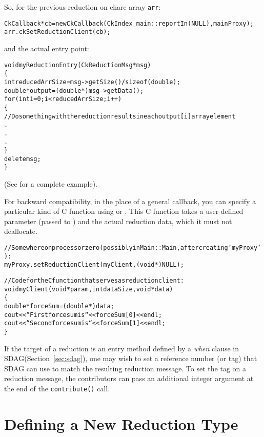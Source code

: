 So, for the previous reduction on chare array {\tt arr}:
\begin{alltt}
    CkCallback *cb = new CkCallback(CkIndex_main::reportIn(NULL),  mainProxy);
    arr.ckSetReductionClient(cb);
\end{alltt}

and the actual entry point:

\begin{alltt}
void myReductionEntry(CkReductionMsg *msg)
\{
  int reducedArrSize=msg->getSize() / sizeof(double);
  double *output=(double *) msg->getData();
  for(int i=0 ; i<reducedArrSize ; i++)
  \{
   // Do something with the reduction results in each output[i] array element
   .
   .
   .
  \}
  delete msg;
\}
\end{alltt}

(See  for a complete example).

For backward compatibility, in the place of a general callback, you can
specify a particular kind of C function using 
or .  This C function takes a user-defined
parameter (passed to ) and the actual reduction data,
which it must not deallocate.

\begin{alltt}
  // Somewhere on processor zero (possibly in Main::Main, after creating 'myProxy'):
  myProxy.setReductionClient(myClient,(void *)NULL);

  // Code for the C function that serves as reduction client:
  void myClient(void *param,int dataSize,void *data)
  \{
    double *forceSum=(double *)data;
    cout<<``First force sum is ``<<forceSum[0]<<endl;
    cout<<``Second force sum is ``<<forceSum[1]<<endl;
  \}
\end{alltt}

If the target of a reduction is an entry method defined by a
\emph{when} clause in SDAG(Section~\ref{sec:sdag}), one may wish to set a
reference number (or tag) that SDAG can use to match the resulting
reduction message. To set the tag on a reduction message, the
contributors can pass an additional integer argument at the end of the
{\tt contribute()} call.

\section{Defining a New Reduction Type}

\label{new_type_reduction}

